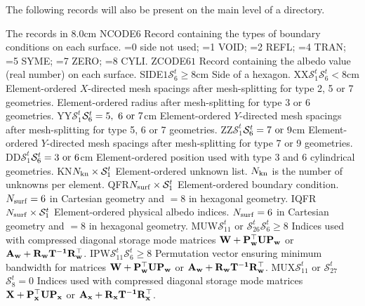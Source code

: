 The following records will also be present on the main level of a 
directory.

\begin{DescriptionEnregistrement}{The  records in
}{8.0cm}
\IntEnr
  {NCODE}{$6$}
  {Record containing the types of boundary conditions on each surface. =0 side
   not used; =1 VOID; =2 REFL; =4 TRAN; =5 SYME; =7 ZERO; =8 CYLI.} 
\RealEnr
  {ZCODE}{$6$}{$1$}
  {Record containing the albedo value (real number) on each surface.} 
\OptRealEnr
  {SIDE}{$1$}{$\mathcal{S}^{t}_{6}\ge 8$}{cm}
  {Side of a hexagon.} 
\OptRealEnr
  {XX}{$\mathcal{S}^{t}_{1}$}{$\mathcal{S}^{t}_{6}<8$}{cm}
  {Element-ordered $X$-directed mesh spacings after mesh-splitting for type 2, 5
   or 7 geometries. Element-ordered radius after mesh-splitting for type 3
   or 6 geometries.} 
\OptRealEnr
  {YY}{$\mathcal{S}^{t}_{1}$}{$\mathcal{S}^{t}_{6}=5, \ 6 \ {\rm or} \ 7$}{cm}
  {Element-ordered $Y$-directed mesh spacings after mesh-splitting for type 5, 6
   or 7 geometries.} 
\OptRealEnr
  {ZZ}{$\mathcal{S}^{t}_{1}$}{$\mathcal{S}^{t}_{6}=7 \ {\rm or} \ 9$}{cm}
  {Element-ordered $Y$-directed mesh spacings after mesh-splitting for type 7
   or 9 geometries.} 
\OptRealEnr
  {DD}{$\mathcal{S}^{t}_{1}$}{$\mathcal{S}^{t}_{6}=3 \ {\rm or} \ 6$}{cm}
  {Element-ordered position used with type 3 and 6 cylindrical geometries.} 
\IntEnr
  {KN}{$N_{\rm kn}\times\mathcal{S}^{t}_{1}$}
  {Element-ordered unknown list. $N_{\rm kn}$ is the number of unknowns per element.} 
\RealEnr
  {QFR}{$N_{\rm surf}\times\mathcal{S}^{t}_{1}$}{}
  {Element-ordered boundary condition. $N_{\rm surf}=6$ in Cartesian geometry and $=8$ in hexagonal geometry.} 
\IntEnr
  {IQFR}{$N_{\rm surf}\times\mathcal{S}^{t}_{1}$}
  {Element-ordered physical albedo indices. $N_{\rm surf}=6$ in Cartesian geometry and $=8$ in hexagonal geometry.} 
\OptIntEnr
  {MUW}{$\mathcal{S}^{t}_{11}$ or $\mathcal{S}^{t}_{26}$}{$\mathcal{S}^{t}_{6}\ge 8$}
  {Indices used with compressed diagonal storage mode matrices $\bf{W}+\bf{P}_w^\top \bf{U}\bf{P}_w$ or $\bf{A}_w+\bf{R}_w\bf{T}^{-1}\bf{R}_w^\top$.} 
\OptIntEnr
  {IPW}{$\mathcal{S}^{t}_{11}$}{$\mathcal{S}^{t}_{6}\ge 8$}
  {Permutation vector ensuring minimum bandwidth for matrices $\bf{W}+\bf{P}_w^\top \bf{U}\bf{P}_w$ or $\bf{A}_w+\bf{R}_w\bf{T}^{-1}\bf{R}_w^\top$.} 
\OptIntEnr
  {MUX}{$\mathcal{S}^{t}_{11}$ or $\mathcal{S}^{t}_{27}$}{$\mathcal{S}^{t}_{8}=0$}
  {Indices used with compressed diagonal storage mode matrices $\bf{X}+\bf{P}_x^\top \bf{U}\bf{P}_x$ or $\bf{A}_x+\bf{R}_x\bf{T}^{-1}\bf{R}_x^\top$.} 

\end{DescriptionEnregistrement}
